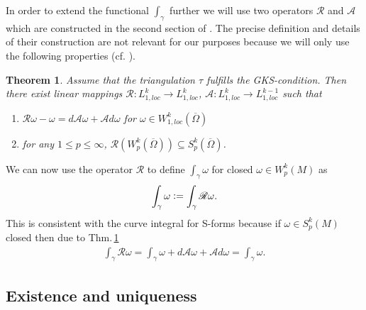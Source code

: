 \documentclass[12pt,a4paper]{article}
\newtheorem{theorem}{Theorem}
\theoremstyle{definition}
\newcommand{\omegabar}{\overline{\Omega}}
\newcommand{\rop}{\mathscr{R}} %
\begin{document}
In order to extend the functional $\int_\gamma$ 
further we will use two operators
$\mathscr{R}$ and $\mathscr{A}$ which are constructed in the second section 
of \cite{goldshtein}. The precise definition and details of their construction
are not relevant for our purposes because we will only use
the following properties (cf. \cite[Thm.2]{goldshtein}).

\begin{theorem}\label{operators}
    Assume that the triangulation $\tau$ fulfills the GKS-condition.
    Then there exist linear mappings $\mathscr{R}: L^k_{1,loc} \rightarrow 
    L^k_{1,loc}$, $\mathscr{A}: L^k_{1,loc} \rightarrow L^{k-1}_{1,loc}$ 
    such that
    \begin{enumerate}
        \item $\mathscr{R}\omega - \omega = 
            d\mathscr{A}\omega + \mathscr{A}d\omega$ for 
            $\omega \in W^k_{1,loc}(\omegabar)$
        \item for any $1 \leq p \leq \infty$, 
            $\rop(W^k_p(\omegabar)) \subseteq S^k_p(\omegabar)$.
    \end{enumerate}
\end{theorem}

\noindent We can now use the operator $\rop$ to define $\int_\gamma \omega$ for closed
$\omega \in W^k_p(M)$ as
\begin{align*}
\int_\gamma \omega \vcentcolon= \int_\gamma \rop\omega.
\end{align*}
This is consistent with the curve integral for S-forms 
because if $\omega \in S^k_p(M)$ closed then due to 
Thm.\,\ref{operators}
\begin{align*}
\int_\gamma \rop\omega = 
\int_\gamma \omega + d\mathscr{A}\omega + \mathscr{A}d\omega = 
\int_\gamma \omega.
\end{align*}










\subsection{Existence and uniqueness}
\end{document}
